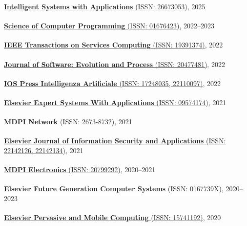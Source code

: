 \href{https://www.sciencedirect.com/journal/intelligent-systems-with-applications}{\textbf{Intelligent Systems with Applications} (ISSN: 26673053)}, 2025
\\ \halfblankline \\
\href{https://www.sciencedirect.com/journal/science-of-computer-programming}{\textbf{Science of Computer Programming} (ISSN: 01676423)}, 2022--2023
\\ \halfblankline \\
\href{https://www.computer.org/csdl/journal/sc}{\textbf{IEEE Transactions on Services Computing} (ISSN: 19391374)}, 2022
\\ \halfblankline \\
\href{https://onlinelibrary.wiley.com/journal/20477481}{\textbf{Journal of Software: Evolution and Process} (ISSN: 20477481)}, 2022
\\ \halfblankline \\
\href{https://www.iospress.com/catalog/journals/intelligenza-artificiale}{\textbf{IOS Press Intelligenza Artificiale} (ISSN: 17248035, 22110097)}, 2022
\\ \halfblankline \\
\href{https://www.journals.elsevier.com/expert-systems-with-applications}{\textbf{Elsevier Expert Systems With Applications} (ISSN: 09574174)}, 2021
\\ \halfblankline \\
\href{https://www.mdpi.com/journal/network}{\textbf{MDPI Network} (ISSN: 2673-8732)}, 2021
\\ \halfblankline \\
\href{https://www.journals.elsevier.com/journal-of-information-security-and-applications}{\textbf{Elsevier Journal of Information Security and Applications} (ISSN: 22142126, 22142134)}, 2021
\\ \halfblankline \\
\href{https://www.mdpi.com/journal/electronics}{\textbf{MDPI Electronics} (ISSN: 20799292)}, 2020--2021
\\ \halfblankline \\
\href{https://www.sciencedirect.com/journal/future-generation-computer-systems}{\textbf{Elsevier Future Generation Computer Systems} (ISSN: 0167739X)}, 2020--2023
\\ \halfblankline \\
\href{https://www.journals.elsevier.com/pervasive-and-mobile-computing}{\textbf{Elsevier Pervasive and Mobile Computing} (ISSN: 15741192)}, 2020
\\ \halfblankline \\
